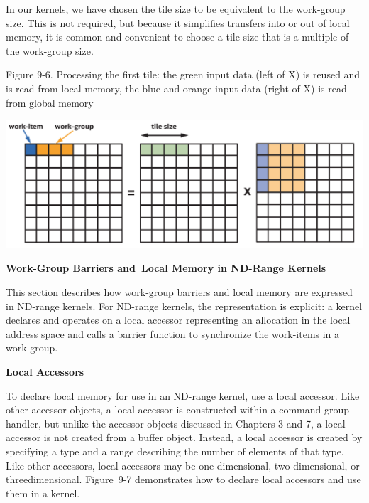 In our kernels, we have chosen the tile size to be equivalent to the work-group size. This is not required, but because it simplifies transfers into or out of local memory, it is common and convenient to choose a tile size that is a multiple of the work-group size.\par

\hspace*{\fill} \par %
Figure 9-6. Processing the first tile: the green input data (left of X) is reused and is read from local memory, the blue and orange input data (right of X) is read from global memory
\begin{center}
	\includegraphics[width=1.\textwidth]{content/chapter-9/images/6}
\end{center}

\hspace*{\fill} \par %
\textbf{Work-Group Barriers and Local Memory in ND-Range Kernels}

This section describes how work-group barriers and local memory are expressed in ND-range kernels. For ND-range kernels, the representation is explicit: a kernel declares and operates on a local accessor representing an allocation in the local address space and calls a barrier function to synchronize the work-items in a work-group.\par

\hspace*{\fill} \par %
\textbf{Local Accessors}

To declare local memory for use in an ND-range kernel, use a local accessor. Like other accessor objects, a local accessor is constructed within a command group handler, but unlike the accessor objects discussed in Chapters 3 and 7, a local accessor is not created from a buffer object. Instead, a local accessor is created by specifying a type and a range describing the number of elements of that type. Like other accessors, local accessors may be one-dimensional, two-dimensional, or threedimensional. Figure 9-7 demonstrates how to declare local accessors and use them in a kernel.\par

